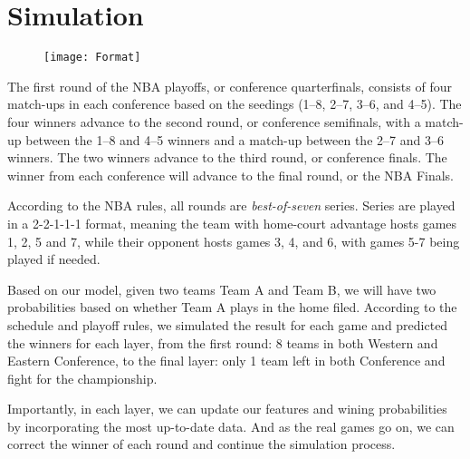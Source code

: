 \section{Simulation}

\begin{figure}[h]
\centering
\texttt{[image: Format]}
\end{figure}

The first round of the NBA playoffs, or conference quarterfinals, consists of 
four match-ups in each conference based on the seedings (1–8, 2–7, 3–6, and 4–5).
The four winners advance to the second round, or conference semifinals, with a 
match-up between the 1–8 and 4–5 winners and a match-up between the 2–7 and 3–6
winners. The two winners advance to the third round, or conference finals.
The winner from each conference will advance to the final round, or the NBA Finals.

According to the NBA rules, all rounds are \textit{best-of-seven} series. Series are played
in a 2-2-1-1-1 format, meaning the team with home-court advantage hosts games
1, 2, 5 and 7, while their opponent hosts games 3, 4, and 6, with games 5-7 
being played if needed.

Based on our model, given two teams Team A and Team B, we will have two
probabilities based on whether Team A plays in the home filed.
According to the schedule and playoff rules, we simulated the result for 
each game and predicted the winners for each layer, from the first round:
8 teams in both Western and Eastern Conference, to the final layer: 
only 1 team left in both Conference and fight for the championship. 

Importantly, in each layer, we can update our features and wining probabilities
by incorporating the most up-to-date data. And as the real games go on, we can
correct the winner of each round and continue the simulation process. 


